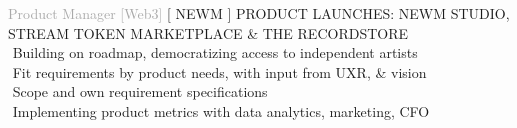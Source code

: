
    
\begin{cvtable}

    {\textcolor{darkgray}{
    Product 
    Manager
    [Web3] 
    }}%
    {[ {N\scriptsize EWM} ]}%
    {%
    {\scriptsize PRODUCT LAUNCHES: NEWM STUDIO, STREAM TOKEN MARKETPLACE \& THE RECORDSTORE} \\
     \textperiodcentered $ $ Building on roadmap, democratizing access to independent artists \\
     \textperiodcentered $ $ Fit requirements by product needs, with input from UXR, \& vision \\
    \textperiodcentered $ $ Scope and own requirement specifications \\
     \textperiodcentered $ $ Implementing product metrics with data analytics, marketing, CFO \\
}


\end{cvtable}
